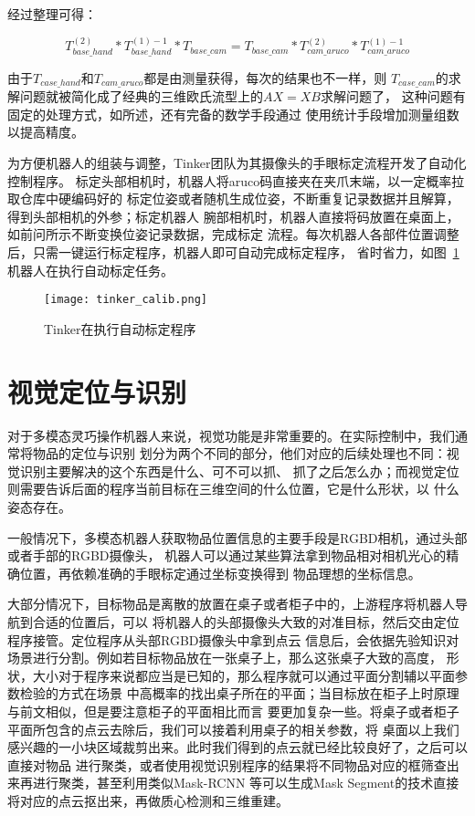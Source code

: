 经过整理可得：

\begin{equation}
  T_{base\_hand}^{(2)} * T_{base\_hand}^{(1) -1} * T_{base\_cam}= 
  T_{base\_cam} * T_{cam\_aruco}^{(2)}  * T_{cam\_aruco}^{(1) -1} 
\end{equation}

由于$T_{case\_hand}$和$T_{cam\_aruco}$都是由测量获得，每次的结果也不一样，则
$T_{case\_cam}$的求解问题就被简化成了经典的三维欧氏流型上的$AX = XB$求解问题了，
这种问题有固定的处理方式，如\cite{park1994robo}所述，还有完备的数学手段通过
使用统计手段增加测量组数以提高精度\cite{tsai1989new}。

为方便机器人的组装与调整，Tinker团队为其摄像头的手眼标定流程开发了自动化控制程序。
标定头部相机时，机器人将aruco码直接夹在夹爪末端，以一定概率拉取仓库中硬编码好的
标定位姿或者随机生成位姿，不断重复记录数据并且解算，得到头部相机的外参；标定机器人
腕部相机时，机器人直接将码放置在桌面上，如前问所示不断变换位姿记录数据，完成标定
流程。每次机器人各部件位置调整后，只需一键运行标定程序，机器人即可自动完成标定程序，
省时省力，如图~\ref{fig:tinker_calib} 机器人在执行自动标定任务。

\begin{figure}[h] %
  \centering
  \texttt{[image: tinker\_calib.png]}
  \caption{Tinker在执行自动标定程序}
  \label{fig:tinker_calib}
\end{figure}


\section{视觉定位与识别}

对于多模态灵巧操作机器人来说，视觉功能是非常重要的。在实际控制中，我们通常将物品的定位与识别
划分为两个不同的部分，他们对应的后续处理也不同：视觉识别主要解决的这个东西是什么、可不可以抓、
抓了之后怎么办；而视觉定位则需要告诉后面的程序当前目标在三维空间的什么位置，它是什么形状，以
什么姿态存在。

一般情况下，多模态机器人获取物品位置信息的主要手段是RGBD相机，通过头部或者手部的RGBD摄像头，
机器人可以通过某些算法拿到物品相对相机光心的精确位置，再依赖准确的手眼标定通过坐标变换得到
物品理想的坐标信息。

大部分情况下，目标物品是离散的放置在桌子或者柜子中的，上游程序将机器人导航到合适的位置后，可以
将机器人的头部摄像头大致的对准目标，然后交由定位程序接管。定位程序从头部RGBD摄像头中拿到点云
信息后，会依据先验知识对场景进行分割。例如若目标物品放在一张桌子上，那么这张桌子大致的高度，
形状，大小对于程序来说都应当是已知的，那么程序就可以通过平面分割辅以平面参数检验的方式在场景
中高概率的找出桌子所在的平面；当目标放在柜子上时原理与前文相似，但是要注意柜子的平面相比而言
要更加复杂一些。将桌子或者柜子平面所包含的点云去除后，我们可以接着利用桌子的相关参数，将
桌面以上我们感兴趣的一小块区域裁剪出来。此时我们得到的点云就已经比较良好了，之后可以直接对物品
进行聚类，或者使用视觉识别程序的结果将不同物品对应的框筛查出来再进行聚类，甚至利用类似Mask-RCNN
等可以生成Mask Segment的技术直接将对应的点云抠出来，再做质心检测和三维重建。

